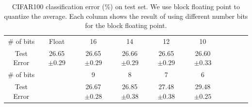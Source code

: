 \begin{table}[h]
\label{table:figure3-data-qswa}
\caption{CIFAR100 classification error (\%) on test set. We use block floating point to quantize the average. Each column shows the result of using different number bits for the block floating point. }
\centering
\begin{tabular}{cccccccccc}
\toprule
\# of bits & Float            & 16               & 14               & 12               & 10               \\
Test Error & 26.65$\pm{0.29}$ & 26.65$\pm{0.29}$ & 26.66$\pm{0.29}$ & 26.65$\pm{0.29}$ & 26.60$\pm{0.33}$ \\
\midrule
\# of bits &  & 9                & 8                & 7                & 6 \\
Test Error &  & 26.67$\pm{0.28}$ & 26.85$\pm{0.38}$ & 27.48$\pm{0.38}$ & 29.48$\pm{0.25}$  \\
\bottomrule
\end{tabular}
\end{table}
